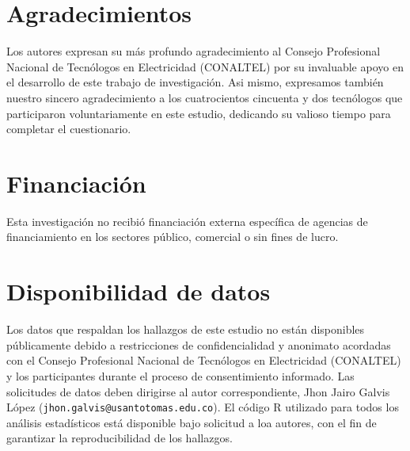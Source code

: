 
\section*{Agradecimientos}
Los autores expresan su más profundo agradecimiento al Consejo Profesional Nacional de Tecnólogos en Electricidad (CONALTEL) por su invaluable apoyo en el desarrollo de este trabajo de investigación. Asi mismo, expresamos también nuestro sincero agradecimiento a los cuatrocientos cincuenta y dos tecnólogos que participaron voluntariamente en este estudio, dedicando su valioso tiempo para completar el cuestionario. 

\section*{Financiación}

Esta investigación no recibió financiación externa específica de agencias de financiamiento en los sectores público, comercial o sin fines de lucro.

\section*{Disponibilidad de datos}

Los datos que respaldan los hallazgos de este estudio no están disponibles públicamente debido a restricciones de confidencialidad y anonimato acordadas con el Consejo Profesional Nacional de Tecnólogos en Electricidad (CONALTEL) y los participantes durante el proceso de consentimiento informado. Las solicitudes de datos deben dirigirse al autor correspondiente, Jhon Jairo Galvis López (\texttt{jhon.galvis@usantotomas.edu.co}). El código R utilizado para todos los análisis estadísticos está disponible bajo solicitud a loa autores, con el fin de garantizar la reproducibilidad de los hallazgos. 


